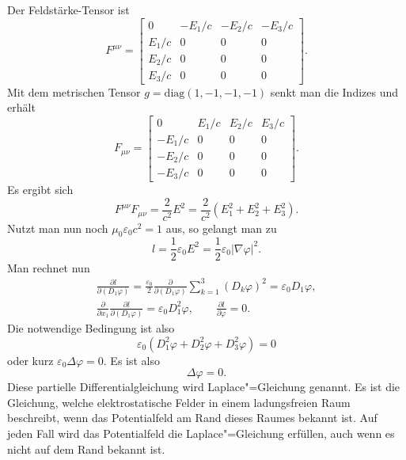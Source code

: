 \documentclass[a4paper,11pt,fleqn,twocolumn,twoside]{scrartcl}
\numberwithin{equation}{section}
\begin{document}
Der Feldstärke-Tensor ist
\begin{equation}
F^{\mu\nu} = \begin{bmatrix}
0 & -E_1/c & -E_2/c & -E_3/c\\
E_1/c & 0 & 0 & 0\\
E_2/c & 0 & 0 & 0\\
E_3/c & 0 & 0 & 0
\end{bmatrix}.
\end{equation}
Mit dem metrischen Tensor $g=\mathrm{diag}(1,-1,-1,-1)$ senkt man
die Indizes und erhält
\begin{equation}
F_{\mu\nu} = \begin{bmatrix}
0 & E_1/c & E_2/c & E_3/c\\
-E_1/c & 0 & 0 & 0\\
-E_2/c & 0 & 0 & 0\\
-E_3/c & 0 & 0 & 0
\end{bmatrix}.
\end{equation}
Es ergibt sich
\begin{equation}
F^{\mu\nu}F_{\mu\nu} = \frac{2}{c^2} E^2
= \frac{2}{c^2} (E_1^2+E_2^2+E_3^2).
\end{equation}
Nutzt man nun noch $\mu_0\varepsilon_0 c^2=1$ aus, so gelangt man zu
\begin{equation}
l = \frac{1}{2}\varepsilon_0 E^2
= \frac{1}{2}\varepsilon_0 |\nabla\varphi|^2.
\end{equation}
Man rechnet nun
\begin{gather*}
\frac{\partial l}{\partial(D_1\varphi)}
= \frac{\varepsilon_0}{2} \frac{\partial}{\partial(D_1\varphi)}
\sum_{k=1}^3 (D_k\varphi)^2 = \varepsilon_0 D_1\varphi,\\
\frac{\partial}{\partial x_1}\frac{\partial l}{\partial(D_1\varphi)}
= \varepsilon_0 D_1^2\varphi,\qquad
\frac{\partial l}{\partial\varphi} = 0.
\end{gather*}
Die notwendige Bedingung ist also
\begin{equation}
\varepsilon_0 (D_1^2\varphi+D_2^2\varphi+D_3^2\varphi) = 0
\end{equation}
oder kurz $\varepsilon_0 \Delta\varphi=0$. Es ist also
\begin{equation}
\Delta\varphi=0.
\end{equation}
Diese partielle Differentialgleichung wird Laplace"=Gleichung genannt.
Es ist die Gleichung, welche elektrostatische Felder in einem
ladungsfreien Raum beschreibt, wenn das Potentialfeld am Rand dieses
Raumes bekannt ist. Auf jeden Fall wird das Potentialfeld die
Laplace"=Gleichung erfüllen, auch wenn es nicht auf dem Rand
bekannt ist.
\end{document}

